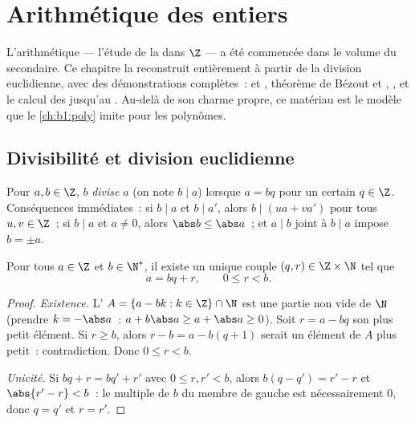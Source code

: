 \chapter{Arithmétique des entiers}\label{ch:b1:arith}

L'arithmétique --- l'étude de la  dans $\Z$ --- a été
commencée dans le volume du secondaire. Ce chapitre la reconstruit
entièrement à partir de la division euclidienne, avec des démonstrations
complètes~:  et , théorème
de Bézout et , , et le
calcul des  jusqu'au . Au-delà de son
charme propre, ce matériau est le modèle que le \cref{ch:b1:poly} imite
pour les polynômes.

\section{Divisibilité et division euclidienne}

\begin{definition}[Divisibilité]\label{def:b1:arith:divides}
Pour $a, b \in \Z$, $b$ \emph{divise} $a$ (on note $b \mid
a$) lorsque $a = bq$ pour un certain $q \in \Z$.
Conséquences immédiates~: si $b \mid a$ et $b \mid a'$, alors $b \mid (ua + va')$
pour tous $u, v \in \Z$~; si $b \mid a$ et $a \neq 0$, alors $\abs b \leq
\abs a$~; et $a \mid b$ joint à $b \mid a$ impose $b = \pm a$.
\end{definition}

\begin{theorem}\label{thm:b1:arith:division}
Pour tous $a \in \Z$ et $b \in \N^*$, il existe un unique couple $(q, r)
\in \Z \times \N$ tel que
\[
a = bq + r, \qquad 0 \leq r < b .
\]
\end{theorem}

\begin{proof}
\emph{Existence.} L' $A = \{a - bk : k \in \Z\} \cap \N$ est une
partie non vide de $\N$ (prendre $k = -\abs a$~: $a + b\abs a \geq a +
\abs a \geq 0$). Soit $r = a - bq$ son plus petit élément. Si $r \geq b$,
alors $r - b = a - b(q+1)$ serait un élément de $A$ plus petit~:
contradiction. Donc $0 \leq r < b$.

\emph{Unicité.} Si $bq + r = bq' + r'$ avec $0 \leq r, r' < b$,
alors $b(q - q') = r' - r$ et $\abs{r' - r} < b$~: le multiple de $b$
du membre de gauche est nécessairement $0$, donc $q = q'$ et $r = r'$.
\end{proof}

